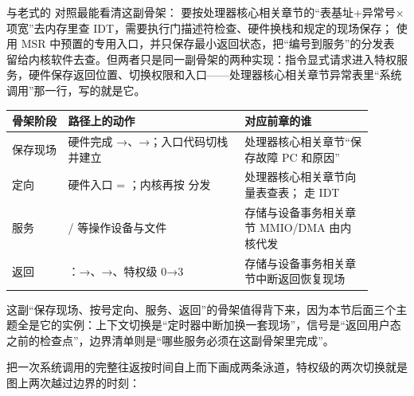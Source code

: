 与老式的  对照最能看清这副骨架： 要按处理器核心相关章节的“表基址+异常号×项宽”去内存里查 IDT，需要执行门描述符检查、硬件换栈和规定的现场保存； 使用 MSR 中预置的专用入口，并只保存最小返回状态，把“编号到服务”的分发表  留给内核软件去查。但两者只是同一副骨架的两种实现：指令显式请求进入特权服务，硬件保存返回位置、切换权限和入口——处理器核心相关章节异常表里“系统调用”那一行，写的就是它。

\begin{longtable}{L{0.14\linewidth}L{0.44\linewidth}L{0.32\linewidth}}
\toprule
骨架阶段 &  路径上的动作 & 对应前章的谁 \\
\midrule
保存现场 & 硬件完成 →、→；入口代码切栈并建立  & 处理器核心相关章节“保存故障 PC 和原因” \\\tablerowrule
定向 & 硬件入口 = ；内核再按  分发 & 处理器核心相关章节向量表查表； 走 IDT \\\tablerowrule
服务 & / 等操作设备与文件 & 存储与设备事务相关章节 MMIO/DMA 由内核代发 \\\tablerowrule
返回 & ：→、→、特权级 0→3 & 存储与设备事务相关章节中断返回恢复现场 \\
\bottomrule
\end{longtable}

这副“保存现场、按号定向、服务、返回”的骨架值得背下来，因为本节后面三个主题全是它的实例：上下文切换是“定时器中断加换一套现场”，信号是“返回用户态之前的检查点”，边界清单则是“哪些服务必须在这副骨架里完成”。

把一次系统调用的完整往返按时间自上而下画成两条泳道，特权级的两次切换就是图上两次越过边界的时刻：

